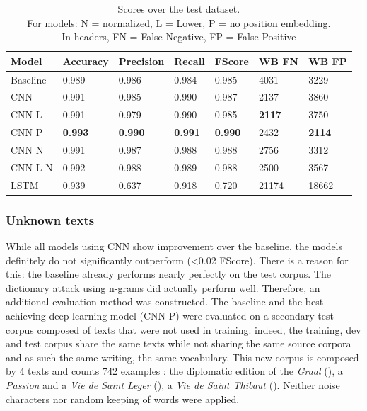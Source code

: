 \documentclass{jdmdh}
\begin{document}
\begin{table}[!ht]
\centering
\begin{tabular}{lllllll}
\hline
Model    & Accuracy & Precision & Recall & FScore & WB FN & WB FP \\ \hline
Baseline & 0.989    & 0.986     & 0.984  & 0.985 & 4031 & 3229 \\
CNN      & 0.991    & 0.985     & 0.990  & 0.987 & 2137 & 3860 \\
CNN L    & 0.991    & 0.979     & 0.990  & 0.985 & \textbf{2117} & 3750 \\
CNN P    & \textbf{0.993}    & \textbf{0.990}& \textbf{0.991}  & \textbf{0.990} & 2432 & \textbf{2114} \\
CNN N    & 0.991    & 0.987     & 0.988  & 0.988 & 2756 & 3312 \\
CNN L N  & 0.992    & 0.988     & 0.989  & 0.988 & 2500 & 3567 \\
LSTM     & 0.939    & 0.637     & 0.918  & 0.720 & 21174 & 18662 \\ \hline
\end{tabular}
\caption{Scores over the test dataset. \\\hspace{\textwidth}For models: N = normalized, L = Lower, P = no position embedding. \\\hspace{\textwidth}In headers, FN = False Negative, FP = False Positive}
\label{tab:scores}
\end{table}

\subsubsection{Unknown texts}

While all models using CNN show improvement over the baseline, the models definitely do not significantly outperform (\textless 0.02 FScore). There is a reason for this: the baseline already performs nearly perfectly on the test corpus. The dictionary attack using n-grams did actually perform well. Therefore, an additional evaluation method was constructed. The baseline and the best achieving deep-learning model (CNN P) were evaluated on a secondary test corpus composed of texts that were not used in training: indeed, the training, dev and test corpus share the same texts while not sharing the same source corpora and as such the same writing, the same vocabulary. This new corpus is composed by 4 texts and counts 742 examples : the diplomatic edition of the \textit{Graal} (\citet{graal}), a \textit{Passion} and a \textit{Vie de Saint Leger}  (\citet{old_french_corpus}), a \textit{Vie de Saint Thibaut} (\citet{theobaldus}). Neither noise characters nor random keeping of words were applied.
\end{document}
